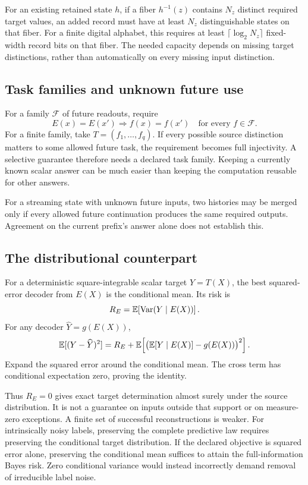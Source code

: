For an existing retained state \(h\), if a fiber \(h^{-1}(z)\) contains \(N_z\)
distinct required target values, an added record must have at least \(N_z\)
distinguishable states on that fiber. For a finite digital alphabet, this
requires at least \(\lceil\log_2N_z\rceil\) fixed-width record bits on that
fiber. The needed capacity depends on missing target distinctions, rather
than automatically on every missing input distinction.

\subsection{Task families and unknown future use}

For a family \(\mathcal F\) of future readouts, require
\[
 E(x)=E(x')\Longrightarrow
 f(x)=f(x')\quad\text{for every }f\in\mathcal F.
\]
For a finite family, take \(T=(f_1,\ldots,f_q)\). If every possible source
distinction matters to some allowed future task, the requirement becomes full
injectivity. A selective guarantee therefore needs a declared task family.
Keeping a currently known scalar answer can be much easier than keeping the
computation reusable for other answers.

For a streaming state with unknown future inputs, two histories may be merged
only if every allowed future continuation produces the same required outputs.
Agreement on the current prefix's answer alone does not establish this.

\subsection{The distributional counterpart}

For a deterministic square-integrable scalar target \(Y=T(X)\), the best
squared-error decoder from \(E(X)\) is the conditional mean. Its risk is
\begin{equation}
 R_E=\mathbb E\!\left[\operatorname{Var}(Y\mid E(X))\right].
 \label{eq:bayesrisk}
\end{equation}
For any decoder \(\widehat Y=g(E(X))\),
\begin{equation}
 \mathbb E[(Y-\widehat Y)^2]
 =R_E+
 \mathbb E\!\left[
 \bigl(\mathbb E[Y\mid E(X)]-g(E(X))\bigr)^2
 \right].
 \label{eq:bayesdecomp}
\end{equation}
Expand the squared error around the conditional mean. The cross term has
conditional expectation zero, proving the identity.

Thus \(R_E=0\) gives exact target determination almost surely under the source
distribution. It is not a guarantee on inputs outside that support or on
measure-zero exceptions. A finite set of successful reconstructions is weaker.
For intrinsically noisy labels, preserving the complete predictive law
requires preserving the conditional target distribution. If the declared
objective is squared error alone, preserving the conditional mean suffices
to attain the full-information Bayes risk. Zero conditional variance would
instead incorrectly demand removal of irreducible label noise.

